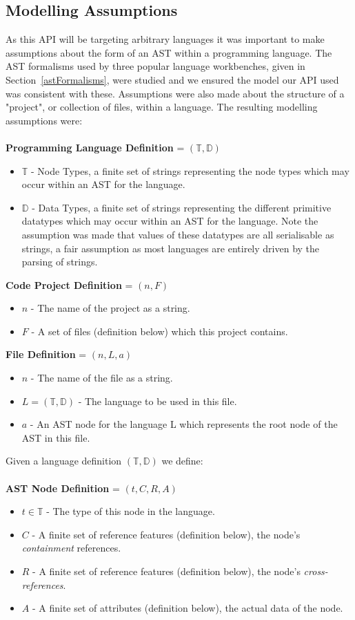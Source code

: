 \documentclass{article}
\begin{document}
\subsection{Modelling Assumptions}\label{apiAssumptions}
As this API will be targeting arbitrary languages it was important to make assumptions about the form of an AST within a programming language. The AST formalisms used by three popular language workbenches, given in Section~\ref{astFormalisms}, were studied and we ensured the model our API used was consistent with these. Assumptions were also made about the structure of a "project", or collection of files, within a language. The resulting modelling assumptions were:
\\
\\
\textbf{Programming Language Definition} = $(\mathbb{T},\mathbb{D})$ 
\begin{itemize}
\item $\mathbb{T}$ - Node Types, a finite set of strings representing the node types which may occur within an AST for the language.
\item $\mathbb{D}$ - Data Types, a finite set of strings representing the different primitive datatypes which may occur within an AST for the language. Note the assumption was made that values of these datatypes are all serialisable as strings, a fair assumption as most languages are entirely driven by the parsing of strings.
\end{itemize}
%
\textbf{Code Project Definition} = $(n,F )$ 
\begin{itemize}
\item $n$ - The name of the project as a string.
\item $F$ - A set of files (definition below) which this project contains.
\end{itemize}
%
\textbf{File Definition} = $(n, L, a)$ 
\begin{itemize}
\item $n$ - The name of the file as a string.
\item $L=(\mathbb{T},\mathbb{D})$ - The language to be used in this file.
\item $a$ - An AST node for the language L which represents the root node of the AST in this file.
\end{itemize}
%
Given a language definition $(\mathbb{T},\mathbb{D})$ we define:\\
\\
\textbf{AST Node Definition} = $(t,C,R,A)$ 
\begin{itemize}
\item $t\in \mathbb{T}$ - The type of this node in the language.
\item $C$ - A finite set of reference features (definition below), the node's \emph{containment} references.
\item $R$ - A finite set of reference features (definition below), the node's \emph{cross-references}.
\item $A$ - A finite set of attributes (definition below), the actual data of the node.
\end{itemize}
\end{document}
